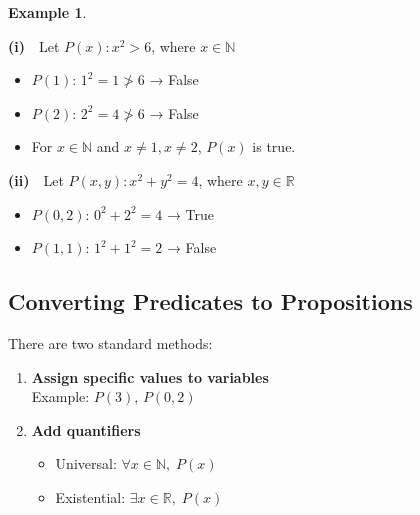 \documentclass[
]{book}
\providecommand{\tightlist}{%
  \setlength{\itemsep}{0pt}\setlength{\parskip}{0pt}}
\theoremstyle{definition}
\theoremstyle{definition}
\newtheorem{example}{Example}[chapter]
\theoremstyle{definition}
\theoremstyle{definition}
\theoremstyle{remark}
\begin{document}
\begin{example}
\protect\hypertarget{exm:unnamed-chunk-43}{}\label{exm:unnamed-chunk-43}

\textbf{(i)} Let \(P(x): x^2 > 6\), where \(x \in \mathbb{N}\)

\begin{itemize}
\tightlist
\item
  \(P(1)\): \(1^2 = 1 \not> 6\) → False\\
\item
  \(P(2)\): \(2^2 = 4 \not> 6\) → False\\
\item
  For \(x \in \mathbb{N}\) and \(x \ne 1, x \ne 2\), \(P(x)\) is true.
\end{itemize}

\textbf{(ii)} Let \(P(x, y): x^2 + y^2 = 4\), where \(x, y \in \mathbb{R}\)

\begin{itemize}
\tightlist
\item
  \(P(0, 2)\): \(0^2 + 2^2 = 4\) → True\\
\item
  \(P(1, 1)\): \(1^2 + 1^2 = 2\) → False
\end{itemize}

\end{example}

\subsection{Converting Predicates to Propositions}\label{converting-predicates-to-propositions}

There are two standard methods:

\begin{enumerate}
\def\labelenumi{\arabic{enumi}.}
\item
  \textbf{Assign specific values to variables}\\
  Example: \(P(3)\), \(P(0, 2)\)
\item
  \textbf{Add quantifiers}

  \begin{itemize}
  \tightlist
  \item
    Universal: \(\forall x \in \mathbb{N},\; P(x)\)\\
  \item
    Existential: \(\exists x \in \mathbb{R},\; P(x)\)
  \end{itemize}
\end{enumerate}

  
\end{document}
